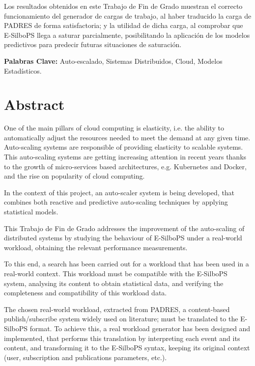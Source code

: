 Los resultados obtenidos en este Trabajo de Fin de Grado muestran el correcto
funcionamiento del generador de cargas de trabajo, al haber traducido la carga
de PADRES de forma satisfactoria; y la utilidad de dicha carga, al comprobar
que E-SilboPS llega a saturar parcialmente, posibilitando la aplicación de los
modelos predictivos para predecir futuras situaciones de saturación.

\textbf{Palabras Clave:} Auto-escalado, Sistemas Distribuidos, Cloud, Modelos Estadísticos.


\newpage


\chapter*{Abstract}

One of the main pillars of cloud computing is elasticity, i.e. the ability to 
automatically adjust the resources needed to meet the demand at any given time.
Auto-scaling systems are responsible of providing elasticity to scalable systems.
This auto-scaling systems are getting increasing attention in recent years thanks 
to the growth of micro-services based architectures, e.g. Kubernetes and Docker, 
and the rise on popularity of cloud computing.

In the context of this project, an auto-scaler system is being developed, that
combines both reactive and predictive auto-scaling techniques by applying 
statistical models.

This Trabajo de Fin de Grado addresses the improvement of the auto-scaling of 
distributed systems by studying the behaviour of E-SilboPS under a real-world workload,
obtaining the relevant performance measurements.

To this end, a search has been carried out for a workload that has been used in a 
real-world context. This workload must be compatible with the E-SilboPS system, 
analysing its content to obtain statistical data, and verifying  the completeness and 
compatibility of this workload data.

The chosen real-world workload, extracted from PADRES, a content-based 
publish/subscribe system widely used on literature; must be translated to the E-SilboPS
format. To achieve this, a real workload generator has been designed and implemented, 
that performs this translation by interpreting each event and its content, and 
transforming it to the E-SilboPS syntax, keeping its original context (user, 
subscription and publications parameters, etc.).

